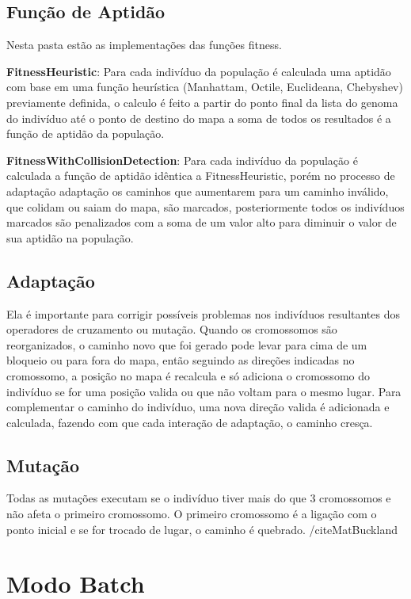  \subsection{Função de Aptidão}
 
 Nesta pasta estão as implementações das funções fitness.
 
 \textbf{FitnessHeuristic}: Para cada indivíduo da população é calculada uma aptidão com base em uma função heurística (Manhattam, Octile, Euclideana, Chebyshev)
 previamente definida, o calculo é feito a partir do ponto final da lista do genoma do indivíduo até o ponto de destino do mapa
 a soma de todos os resultados é a função de aptidão da população.
 
 \textbf{FitnessWithCollisionDetection}: Para cada indivíduo da população é calculada a função de aptidão idêntica a FitnessHeuristic, porém no processo de adaptação adaptação os caminhos que aumentarem para um caminho inválido, que colidam ou saiam do mapa, são marcados,
 posteriormente todos os indivíduos marcados são penalizados com a  soma de  um valor alto para diminuir o valor de sua aptidão na população.
 
 \subsection{Adaptação}
 
 Ela é importante para corrigir possíveis problemas nos indivíduos resultantes dos operadores de cruzamento ou mutação. Quando os cromossomos são reorganizados, 
 o caminho novo que foi gerado pode levar para cima de um bloqueio ou para fora do mapa, então seguindo as direções indicadas no cromossomo, 
 a posição no mapa é recalcula e só adiciona o cromossomo do indivíduo se for uma posição valida ou que não voltam para o mesmo lugar.
 Para complementar o caminho do indivíduo, uma nova direção valida é adicionada e calculada, fazendo com que cada interação de adaptação, o caminho cresça.
 
 \subsection{Mutação}
 
 Todas as mutações executam se o indivíduo tiver mais do que 3 cromossomos e não afeta o primeiro cromossomo.
 O primeiro cromossomo é a ligação com o ponto inicial e se for trocado de lugar, o caminho é quebrado. /cite{MatBuckland}
 
 \section{Modo Batch}
 
